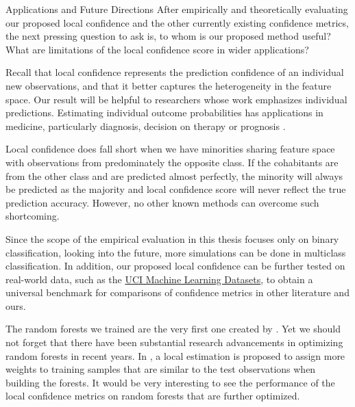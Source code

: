 \documentclass[12pt]{pom_thesis}
\begin{document}
\begin{chapter}{Applications and Future Directions}
After empirically and theoretically evaluating our proposed local confidence and the other currently existing confidence metrics, the next pressing question to ask is, to whom is our proposed method useful? What are limitations of the local confidence score in wider applications?

Recall that local confidence represents the prediction confidence of an individual new observations, and that it better captures the heterogeneity in the feature space. Our result will be helpful to researchers whose work emphasizes individual predictions. Estimating individual outcome probabilities has applications in medicine, particularly diagnosis, decision on therapy or prognosis \citep{Dankowski}. 

Local confidence does fall short when we have minorities sharing feature space with observations from predominately the opposite class. If the cohabitants are from the other class and are predicted almost perfectly, the minority will always be predicted as the majority and local confidence score will never reflect the true prediction accuracy. However, no other known methods can overcome such shortcoming.  

Since the scope of the empirical evaluation in this thesis focuses only on binary classification, looking into the future, more simulations can be done in multiclass classification. In addition, our proposed local confidence can be further tested on real-world data, such as the \href{https://archive.ics.uci.edu/ml/datasets.php}{UCI Machine Learning Datasets}, to obtain a universal benchmark for comparisons of confidence metrics in other literature and ours.

The random forests we trained are the very first one created by \cite{Breiman}. Yet we should not forget that there have been substantial research advancements in optimizing random forests in recent years. In \cite{WagerJMLR}, a local estimation is proposed to assign more weights to training samples that are similar to the test observations when building the forests. It would be very interesting to see the performance of the local confidence metrics on random forests that are further optimized. 


\end{chapter}
\end{document}
